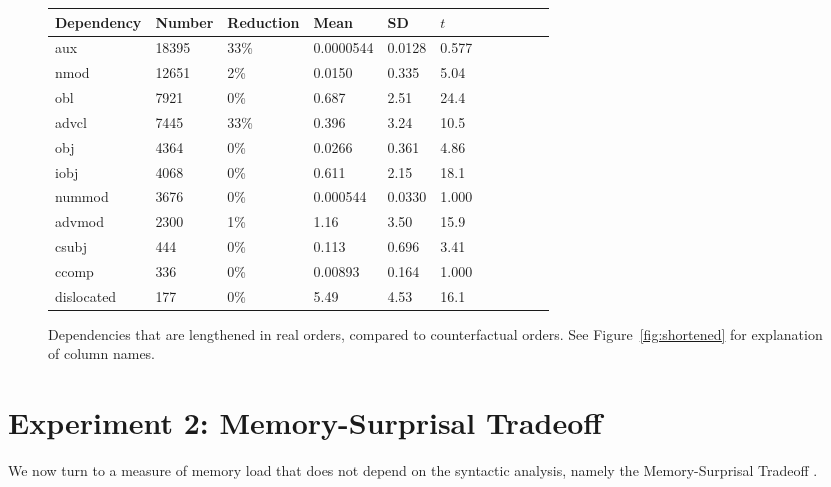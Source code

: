 \documentclass[11pt,a4paper]{article}
\begin{document}
\begin{figure}
\begin{center}
\begin{tabular}{l|llllllllll}
   Dependency  &Number &Reduction     &  Mean   &   SD &       $t$ \\ \hline
  aux      &    18395  &  33\% &  0.0000544  &0.0128 &   0.577 \\
 nmod         &12651  &  2\%&  0.0150     &0.335  &   5.04  \\
 obl          & 7921  &  0\%     &  0.687      &2.51&     24.4   \\
  advcl        & 7445  &  33\% &  0.396      &3.24  &   10.5   \\
 obj          & 4364  &  0\%     &  0.0266     &0.361 &    4.86  \\
 iobj         & 4068  &  0\%    &  0.611      &2.15  &   18.1   \\
 nummod       & 3676  &  0\%     &  0.000544   &0.0330&    1.000 \\
 advmod       & 2300  &  1\%&  1.16       &3.50  &   15.9   \\
 csubj        &  444  &  0\%    &   0.113      &0.696 &    3.41  \\
 ccomp        &  336  &  0\%    &   0.00893    &0.164 &    1.000 \\
 dislocated   &  177  &  0\%    &   5.49       &4.53  &   16.1   \\
\end{tabular}
\end{center}
\caption{Dependencies that are lengthened in real orders, compared to counterfactual orders. See Figure~\ref{fig:shortened} for explanation of column names.}\label{fig:lengthened}
\end{figure}



\section{Experiment 2: Memory-Surprisal Tradeoff}

We now turn to a measure of memory load that does not depend on the syntactic analysis, namely the Memory-Surprisal Tradeoff \citep{hahn2019memory}.
\end{document}

